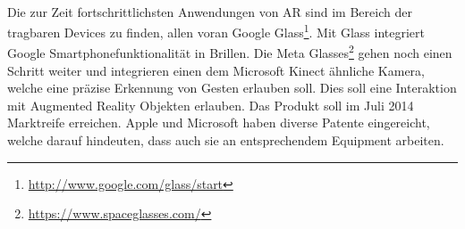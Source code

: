 \paragraph{}
Die zur Zeit fortschrittlichsten Anwendungen von AR sind im Bereich der tragbaren Devices zu finden, allen voran Google Glass\footnote{\protect\url{http://www.google.com/glass/start}}. Mit Glass integriert Google Smartphonefunktionalität in Brillen. Die Meta Glasses\footnote{\protect\url{https://www.spaceglasses.com/}} gehen noch einen Schritt weiter und integrieren einen dem Microsoft Kinect ähnliche Kamera, welche eine präzise Erkennung von Gesten erlauben soll. Dies soll eine Interaktion mit Augmented Reality Objekten erlauben. Das Produkt soll im Juli 2014 Marktreife erreichen. Apple und Microsoft haben diverse Patente eingereicht, welche darauf hindeuten, dass auch sie an entsprechendem Equipment arbeiten.